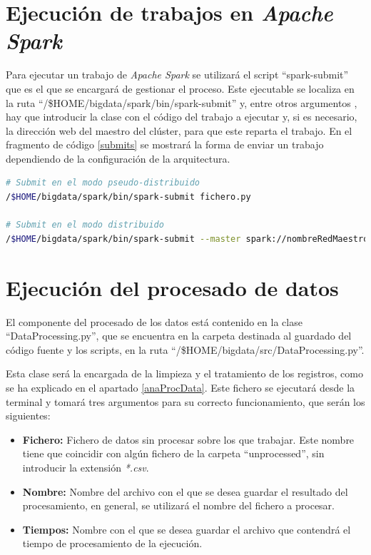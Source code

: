 \section{Ejecución de trabajos en \textit{Apache Spark}}
Para ejecutar un trabajo de \textit{Apache Spark} se utilizará el script ``spark-submit'' que es el que se encargará de gestionar el proceso. Este ejecutable se localiza en la ruta ``/\$HOME/bigdata/spark/bin/spark-submit'' y, entre otros argumentos \cite{submitSpark}, hay que introducir la clase con el código del trabajo a ejecutar y, si es necesario, la dirección web del maestro del clúster, para que este reparta el trabajo. En el fragmento de código \ref{submits} se mostrará la forma de enviar un trabajo dependiendo de la configuración de la arquitectura.

\begin{lstlisting}[label=submits,language=sh,frame=single,caption=Comando para el envío de un trabajo a \textit{Apache Spark} dependiendo del modo de ejecución de la arquitectura \textit{big data}]
# Submit en el modo pseudo-distribuido
/$HOME/bigdata/spark/bin/spark-submit fichero.py

# Submit en el modo distribuido
/$HOME/bigdata/spark/bin/spark-submit --master spark://nombreRedMaestro:7077 fichero.py
\end{lstlisting}


\section{Ejecución del procesado de datos}
El componente del procesado de los datos está contenido en la clase ``DataProcessing.py'', que se encuentra en la carpeta destinada al guardado del código fuente y los scripts, en la ruta ``/\$HOME/bigdata/src/DataProcessing.py''.

Esta clase será la encargada de la limpieza y el tratamiento de los registros, como se ha explicado en el apartado \ref{anaProcData}. Este fichero se ejecutará desde la terminal y tomará tres argumentos para su correcto funcionamiento, que serán los siguientes:

\begin{itemize}
\item \textbf{Fichero:} Fichero de datos sin procesar sobre los que trabajar. Este nombre tiene que coincidir con algún fichero de la carpeta ``unprocessed'', sin introducir la extensión \textit{*.csv}.
\item \textbf{Nombre:} Nombre del archivo con el que se desea guardar el resultado del procesamiento, en general, se utilizará el nombre del fichero a procesar.
\item \textbf{Tiempos:} Nombre con el que se desea guardar el archivo que contendrá el tiempo de procesamiento de la ejecución.
\end{itemize}

